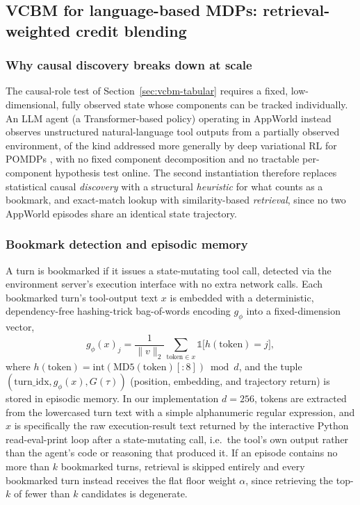 \documentclass[conference]{IEEEtran}
\begin{document}
\subsection{VCBM for language-based MDPs: retrieval-weighted credit blending}
\label{sec:vcbm-appworld}

\subsubsection{Why causal discovery breaks down at scale}
The causal-role test of Section~\ref{sec:vcbm-tabular} requires a fixed, low-dimensional, fully observed state whose components can be tracked individually. An LLM agent (a Transformer-based \cite{b_vaswani2017attention} policy) operating in AppWorld \cite{b_trivedi2024appworld} instead observes unstructured natural-language tool outputs from a partially observed environment, of the kind addressed more generally by deep variational RL for POMDPs \cite{b_igl2018dvrl}, with no fixed component decomposition and no tractable per-component hypothesis test online. The second instantiation therefore replaces statistical causal \emph{discovery} with a structural \emph{heuristic} for what counts as a bookmark, and exact-match lookup with similarity-based \emph{retrieval}, since no two AppWorld episodes share an identical state trajectory.

\subsubsection{Bookmark detection and episodic memory}
A turn is bookmarked if it issues a state-mutating tool call, detected via the environment server's execution interface with no extra network calls. Each bookmarked turn's tool-output text $x$ is embedded with a deterministic, dependency-free hashing-trick bag-of-words encoding $g_\phi$ into a fixed-dimension vector,
\begin{equation}
  g_\phi(x)_j = \frac{1}{\lVert v \rVert_2} \sum_{\mathrm{token} \in x} \mathbb{1}\big[h(\mathrm{token}) = j\big] ,
  \label{eq:hashing-encoder}
\end{equation}
where $h(\mathrm{token}) = \mathrm{int}(\mathrm{MD5}(\mathrm{token})[{:}8]) \bmod d$, and the tuple $(\mathrm{turn\_idx}, g_\phi(x), G(\tau))$ (position, embedding, and trajectory return) is stored in episodic memory. In our implementation $d=256$, tokens are extracted from the lowercased turn text with a simple alphanumeric regular expression, and $x$ is specifically the raw execution-result text returned by the interactive Python read-eval-print loop after a state-mutating call, i.e.\ the tool's own output rather than the agent's code or reasoning that produced it. If an episode contains no more than $k$ bookmarked turns, retrieval is skipped entirely and every bookmarked turn instead receives the flat floor weight $\alpha$, since retrieving the top-$k$ of fewer than $k$ candidates is degenerate.
\end{document}
